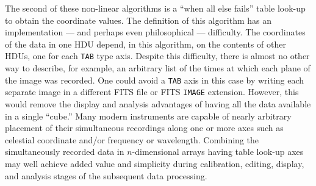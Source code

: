 \documentclass[twoside]{article}
\newcommand{\keyw}[1]{\hbox{{\tt #1}}}
\begin{document}
The second of these non-linear algorithms is a ``when all else fails''
table look-up to obtain the coordinate values.  The definition of this
algorithm has an implementation --- and perhaps even philosophical ---
difficulty.  The coordinates of the data in one HDU depend, in this
algorithm, on the contents of other HDUs, one for each \keyw{TAB} type
axis.  Despite this difficulty, there is almost no other way to
describe, for example, an arbitrary list of the times at which each
plane of the image was recorded.  One could avoid a \keyw{TAB} axis in
this case by writing each separate image in a different FITS file or
FITS \keyw{IMAGE} extension.  However, this would remove the display
and analysis advantages of having all the data available in a single
``cube.''  Many modern instruments are capable of nearly arbitrary
placement of their simultaneous recordings along one or more axes such
as celestial coordinate and/or frequency or wavelength.  Combining the
simultaneously recorded data in $n$-dimensional arrays having table
look-up axes may well achieve added value and simplicity during
calibration, editing, display, and analysis stages of the subsequent
data processing.
\end{document}
